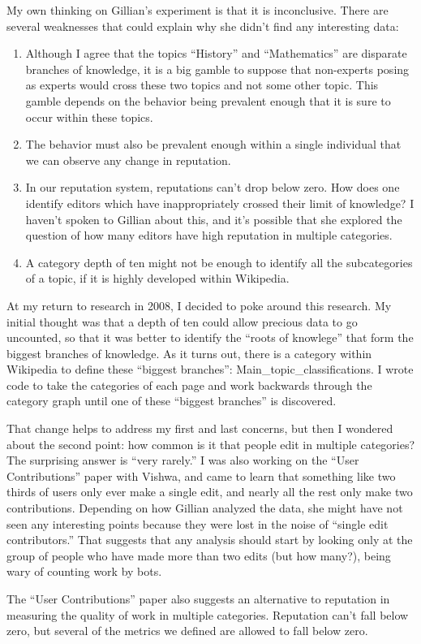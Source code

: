 My own thinking on Gillian's experiment is that it is inconclusive.
There are several weaknesses that could explain why she didn't
find any interesting data:
\begin{enumerate}
\item Although I agree that the topics ``History'' and ``Mathematics''
	are disparate branches of knowledge, it is a big gamble to
	suppose that non-experts posing as experts would cross these
	two topics and not some other topic.
	This gamble depends on the behavior being prevalent enough
	that it is sure to occur within these topics.
\item The behavior must also be prevalent enough within a single
	individual that we can observe any change in reputation.
\item In our reputation system, reputations can't drop below zero.
	How does one identify editors which have inappropriately
	crossed their limit of knowledge?  I haven't spoken to Gillian
	about this, and it's possible that she explored the question
	of how many editors have high reputation in multiple categories.
\item A category depth of ten might not be enough to identify all the
	subcategories of a topic, if it is highly developed within
	Wikipedia.
\end{enumerate}

At my return to research in 2008, I decided to poke around this research.
My initial thought was that a depth of ten could allow precious data
to go uncounted, so that it was better to identify the ``roots of
knowlege'' that form the biggest branches of knowledge.
As it turns out, there is a category within Wikipedia to define
these ``biggest branches'': Main\_topic\_classifications.
I wrote code to take the categories of each page and work
backwards through the category graph until one of these
``biggest branches'' is discovered.

That change helps to address my first and last concerns, but then I wondered
about the second point: how common is it that people edit in
multiple categories?
The surprising answer is ``very rarely.''
I was also working on the ``User Contributions'' paper with Vishwa,
and came to learn that something like two thirds of users only
ever make a single edit, and nearly all the rest only make two contributions.
Depending on how Gillian analyzed the data, she might have not seen
any interesting points because they were lost in the noise of
``single edit contributors.''
That suggests that any analysis should start by looking only
at the group of people who have made more than two edits (but how
many?), being wary of counting work by bots.

The ``User Contributions'' paper also suggests an alternative
to reputation in measuring the quality of work in multiple categories.
Reputation can't fall below zero, but several of the metrics we
defined are allowed to fall below zero.

